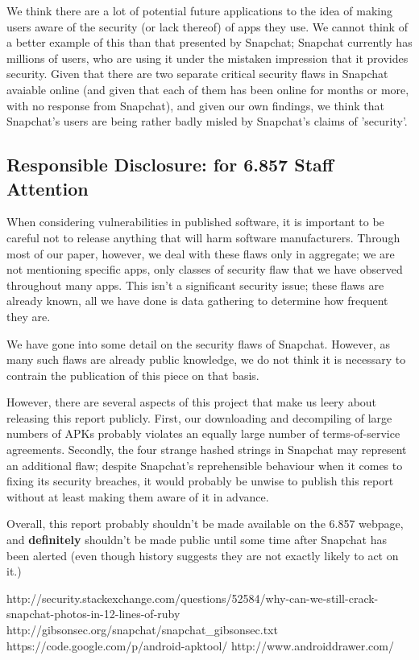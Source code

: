 \documentclass[11pt]{article}
\numberwithin{theorem}{subsection}
\begin{document}
We think there are a lot of potential future applications to the idea of making users aware of the security (or lack thereof) of apps they use.  We
cannot think of a better example of this than that presented by Snapchat; Snapchat currently has millions of users, who are using it under the
mistaken impression that it provides security.  Given that there are two separate critical security flaws in Snapchat avaiable online (and given that
each of them has been online for months or more, with no response from Snapchat), and given our own findings, we think that Snapchat's users are being
rather badly misled by Snapchat's claims of 'security'.

\subsection{Responsible Disclosure: for 6.857 Staff Attention}

When considering vulnerabilities in published software, it is important to be careful not to release anything that will harm software manufacturers.
Through most of our paper, however, we deal with these flaws only in aggregate; we are not mentioning specific apps, only classes of security
flaw that we have observed throughout many apps.  This isn't a significant security issue; these flaws are already known, all we have done is
data gathering to determine how frequent they are.

We have gone into some detail on the security flaws of Snapchat.  However, as many such flaws are already public knowledge\cite{1}\cite{2}, we do
not think it is necessary to contrain the publication of this piece on that basis.

However, there are several aspects of this project that make us leery about releasing this report publicly.  First, our downloading and decompiling
of large numbers of APKs probably violates an equally large number of terms-of-service agreements.  Secondly, the four strange hashed strings in Snapchat 
may represent an additional flaw; despite Snapchat's reprehensible behaviour when it comes to fixing its security breaches, it would probably be unwise 
to publish this report without at least making them aware of it in advance.

Overall, this report probably shouldn't be made available on the 6.857 webpage, and \textbf{definitely} shouldn't be made public until some time after
Snapchat has been alerted (even though history suggests they are not exactly likely to act on it.) 

\begin{thebibliography}{9}

        http://security.stackexchange.com/questions/52584/why-can-we-still-crack-snapchat-photos-in-12-lines-of-ruby
        http://gibsonsec.org/snapchat/snapchat\_gibsonsec.txt
        https://code.google.com/p/android-apktool/
        http://www.androiddrawer.com/

\end{thebibliography}
\end{document}
